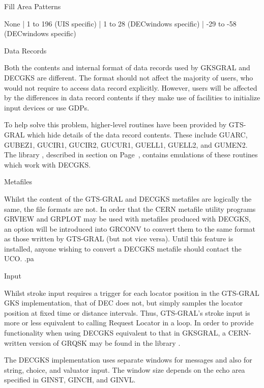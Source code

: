 \begin{UL}
Fill Area Patterns
\begin{XMP}
      None                    |   1 to 196 (UIS specific)
                              |   1 to  28 (DECwindows specific)
                              | -29 to -58 (DECwindows specific)
\end{XMP}
\item Data Records
 
Both the contents and internal format of data records used by
GKSGRAL and DECGKS are different. The format should not affect the majority
of users, who would not require to access data record explicitly.
However, users will be affected by the differences in data record
contents if they make use of facilities to initialize input devices
or use GDPs.
 
To help solve this problem, higher-level routines have been provided
by GTS-GRAL which hide details of the data record contents.
These include GUARC, GUBEZ1, GUCIR1, GUCIR2, GUCUR1, GUELL1, GUELL2,
and GUMEN2. The library , described in section
on Page~\pageref{sec:gkspref}, contains
emulations of these routines which work with DECGKS.
\item Metafiles
 
Whilst the content of the GTS-GRAL and DECGKS metafiles are logically
the same, the file formats are not. In order that the CERN metafile
utility programs GRVIEW and GRPLOT may be used with metafiles produced
with DECGKS, an option will be introduced into GRCONV to convert them
to the same format as those written by GTS-GRAL (but not vice versa).
Until this feature is installed, anyone wishing to convert a DECGKS
metafile should contact the UCO.
.pa
\item Input
 
Whilst stroke input requires a trigger for each locator position in the
GTS-GRAL GKS implementation, that of DEC does not, but simply samples
the locator position at fixed time or distance intervals.
Thus, GTS-GRAL's stroke input is more or less equivalent to
calling Request Locator in a loop.
In order to provide functionality when using DECGKS equivalent to that
in GKSGRAL, a CERN-written version of GRQSK may be found in the library
.
 
The DECGKS implementation uses separate windows for messages and
also for string, choice, and valuator input.
The window size depends on the echo area specified in GINST, GINCH,
and GINVL.
\end{UL}
